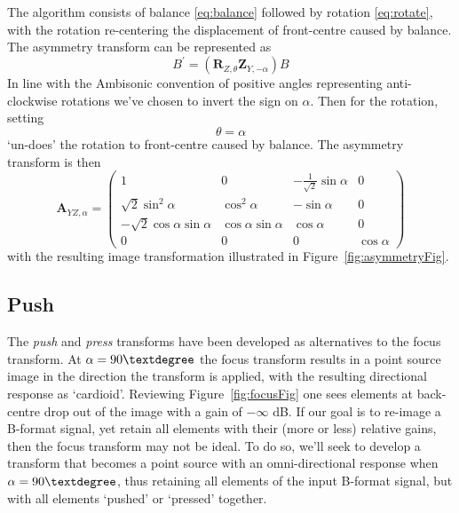 \documentclass[12pt]{article}
\begin{document}
The algorithm consists of balance \eqref{eq:balance} followed by rotation \eqref{eq:rotate}, with the rotation re-centering the displacement of front-centre caused by balance. The asymmetry transform can be represented as \begin{equation}	\label{eq:asym_1}
	B^{\prime} = (\mathbf{R}_{Z, \theta} \mathbf{Z}_{Y, -\alpha}) B 
\end{equation} In line with the Ambisonic convention of positive angles representing anti-clockwise rotations we've chosen to invert the sign on \(\alpha\). Then for the rotation, setting \begin{equation}
	\theta = \alpha
\end{equation} `un-does' the rotation to front-centre caused by balance. The asymmetry transform is then \begin{equation}
\mathbf{A}_{YZ, \alpha} = \begin{pmatrix}
	1 & 0 & -\frac{1}{\sqrt{2}} \sin{\alpha} & 0\\
	\sqrt{2}\sin^2{\alpha} & \cos^2{\alpha} & -\sin{\alpha} & 0\\
	-\sqrt{2}\cos{\alpha}\sin{\alpha} & \cos{\alpha}\sin{\alpha} & \cos{\alpha} & 0\\
	0 & 0 & 0 & \cos{\alpha}
\end{pmatrix}
\end{equation} with the resulting image transformation illustrated in Figure~\ref{fig:asymmetryFig}. 


\subsection{Push}

The {\em push}  and {\em press} transforms have been developed as alternatives to the focus transform. At \(\alpha = 90\textdegree\) the focus transform results in a point source image in the direction the transform is applied, with the resulting directional response as `cardioid'. Reviewing Figure~\ref{fig:focusFig} one sees elements at back-centre drop out of the image with a gain of \(-\infty\) dB. If our goal is to re-image a B-format signal, yet retain all elements with their (more or less) relative gains, then the focus transform may not be ideal. To do so, we'll seek to develop a transform that becomes a point source with an omni-directional response when \(\alpha = 90\textdegree\), thus retaining all elements of the input B-format signal, but with all elements `pushed' or `pressed' together.
\end{document}
